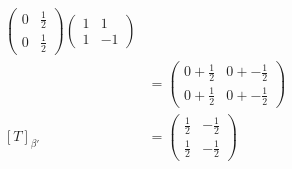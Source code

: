 \documentclass[13pt]{article}
\begin{document}
\begin{align*}
\begin{pmatrix}
                           0 & \frac{1}{2} \\
                           0 & \frac{1}{2}
                         \end{pmatrix}
                         \begin{pmatrix}
                           1 & 1 \\
                           1 & -1
                         \end{pmatrix} \\
                       &=
                         \begin{pmatrix}
                           0 + \frac{1}{2} & 0 + -\frac{1}{2} \\
                           0 + \frac{1}{2} & 0 + -\frac{1}{2}
                         \end{pmatrix} \\
          [T]_{\beta'} &=
                         \begin{pmatrix}
                           \frac{1}{2} & -\frac{1}{2} \\
                           \frac{1}{2} & -\frac{1}{2}                                   
                         \end{pmatrix}
        \end{align*}
      
\end{document}

